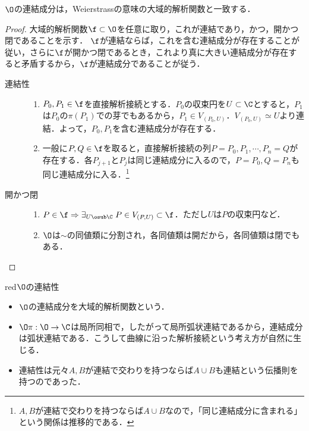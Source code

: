 \documentclass[uplatex, dvipdfmx]{jsreport}
\begin{document}
\begin{theorem}[大域的解析関数の特徴付け]
    $\O$の連結成分は，Weierstrassの意味の大域的解析関数と一致する．
\end{theorem}
\begin{proof}
    大域的解析関数$\f\subset\O$を任意に取り，これが連結であり，かつ，開かつ閉であることを示す．
    $\f$が連結ならば，これを含む連結成分が存在することが従い，さらに$\f$が開かつ閉であるとき，これより真に大きい連結成分が存在すると矛盾するから，$\f$が連結成分であることが従う．
    \begin{description}
        \item[連結性] 
        \begin{enumerate}
            \item $P_0,P_1\in\f$を直接解析接続とする．$P_0$の収束円を$U\subset\C$とすると，$P_1$は$P_0$の$\pi(P_1)$での芽でもあるから，$P_1\in V_{(P_0,U)}$．$V_{(P_0,U)}\simeq U$より連結．よって，$P_0,P_1$を含む連結成分が存在する．
            \item 一般に$P,Q\in\f$を取ると，直接解析接続の列$P=P_0,P_1,\cdots,P_n=Q$が存在する．各$P_{j+1}$と$P_j$は同じ連結成分に入るので，$P=P_0,Q=P_n$も同じ連結成分に入る．\footnote{$A,B$が連結で交わりを持つならば$A\cup B$なので，「同じ連結成分に含まれる」という関係は推移的である．}
        \end{enumerate}
        \item[開かつ閉]
        \begin{enumerate}
            \item $P\in\f\Rightarrow \exists_{U\osub\C}\;P\in V_{(P,U)}\subset\f$．ただし$U$は$P$の収束円など．
            \item $\O$は$\sim$の同値類に分割され，各同値類は開だから，各同値類は閉でもある．
        \end{enumerate}
    \end{description}
\end{proof}

\begin{tbox}{red}{$\O$の連結性}
    \begin{itemize}
        \item $\O$の連結成分を大域的解析関数という．
        \item $\O\pi:\O\to\C$は局所同相で，したがって局所弧状連結であるから，連結成分は弧状連結である．こうして曲線に沿った解析接続という考え方が自然に生じる．
        \item 連結性は元々$A,B$が連結で交わりを持つならば$A\cup B$も連結という伝播則を持つのであった．
    \end{itemize}
\end{tbox}
\end{document}
